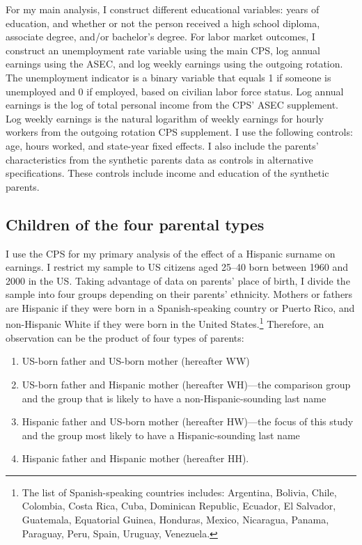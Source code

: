 For my main analysis, I construct different educational variables: years of education, and whether or not the person received a high school diploma, associate degree, and/or bachelor’s degree. For labor market outcomes, I construct an unemployment rate variable using the main CPS, log annual earnings using the ASEC, and log weekly earnings using the outgoing rotation. The unemployment indicator is a binary variable that equals 1 if someone is unemployed and 0 if employed, based on civilian labor force status. Log annual earnings is the log of total personal income from the CPS’ ASEC supplement. Log weekly earnings is the natural logarithm of weekly earnings for hourly workers from the outgoing rotation CPS supplement. I use the following controls: age, hours worked, and state-year fixed effects. I also include the parents’ characteristics from the synthetic parents data as controls in alternative specifications. These controls include income and education of the synthetic parents.

\subsection{Children of the four parental types}

I use the CPS for my primary analysis of the effect of a Hispanic surname on earnings. I restrict my sample to US citizens  aged 25–40 born between 1960 and 2000 in the US. Taking advantage of data on parents’ place of birth, I divide the sample into four groups depending on their parents’ ethnicity. Mothers or fathers are Hispanic if they were born in a Spanish-speaking country or Puerto Rico, and non-Hispanic White if they were born in the United States.\footnote{The list of Spanish-speaking countries includes: Argentina, Bolivia, Chile, Colombia, Costa Rica, Cuba, Dominican Republic, Ecuador, El Salvador, Guatemala, Equatorial Guinea, Honduras, Mexico, Nicaragua, Panama, Paraguay, Peru, Spain, Uruguay, Venezuela.} Therefore, an observation can be the product of four types of parents:
\begin{enumerate}
\item US-born father and US-born mother (hereafter WW) 
\item US-born father and Hispanic mother (hereafter WH)---the comparison group and the group that is likely to have a non-Hispanic-sounding last name
\item Hispanic father and US-born mother (hereafter HW)---the focus of this study and the group most likely to have a Hispanic-sounding last name
\item Hispanic father and Hispanic mother (hereafter HH).
\end{enumerate}


